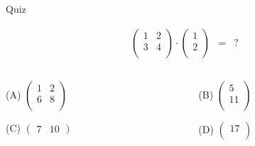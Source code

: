 \documentclass[german]{beamer}
\newcommand{\bq}{\begin{eqnarray*}}
\newcommand{\eq}{\end{eqnarray*}}
\begin{document}
\begin{frame}{Quiz}

\bq
\left( \begin{array}{cc}
 1 & 2 \\
 3 & 4 \\
\end{array} \right)
 \cdot
\left( \begin{array}{c}
 1 \\
 2 \\
\end{array} \right)
 & = & ?
\eq
\begin{columns}[b]
\begin{column}{5cm}
\begin{description}
\item{(A)} $\left( \begin{array}{cc} 1 & 2 \\ 6 & 8 \\ \end{array} \right)$
\item{(C)} $\left( \begin{array}{cc} 7 & 10 \end{array} \right)$
\end{description}
\end{column}
\begin{column}{5cm}
\begin{description}
\item{(B)} $\left( \begin{array}{c} 5 \\ 11 \\ \end{array} \right)$
\item{(D)} $\left( \begin{array}{c} 17 \\ \end{array} \right)$
\end{description}
\end{column}
\end{columns}

\end{frame}
\end{document}
